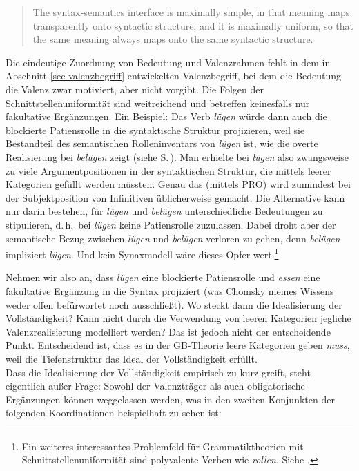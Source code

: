 \begin{quote}
The syntax-semantics interface is maximally simple, in that meaning maps transparently onto syntactic structure; and it is maximally uniform, so that the same meaning always maps onto the same syntactic structure. \citep[47]{Culicover:Jackendoff:05}
\end{quote}
Die eindeutige Zuordnung von Bedeutung und Valenzrahmen fehlt in dem in Abschnitt \ref{sec-valenzbegriff} entwickelten Valenzbegriff, bei dem die Bedeutung die Valenz zwar motiviert, aber nicht vorgibt. Die Folgen der Schnittstellenuniformität sind weitreichend und betreffen keinesfalls nur fakultative Ergänzungen. Ein Beispiel: Das Verb {\it lügen} würde dann auch die blockierte Patiensrolle in die syntaktische Struktur projizieren, weil sie Bestandteil des semantischen Rolleninventars von \textit{lügen} ist, wie die overte Realisierung bei {\it belügen} zeigt (siehe S.\,\pageref{ex-luegen}). Man erhielte bei \textit{lügen} also zwangsweise zu viele Argumentpositionen in der syntaktischen Struktur, die mittels leerer Kategorien gefüllt werden müssten. Genau das (mittels PRO) wird zumindest bei der Subjektposition von Infinitiven üblicherweise gemacht. Die Alternative kann nur darin bestehen, für {\it lügen} und {\it belügen} unterschiedliche Bedeutungen zu stipulieren, d.\,h.\ bei \textit{lügen} keine Patiensrolle zuzulassen. Dabei droht aber der semantische Bezug zwischen \textit{lügen} und \textit{belügen} verloren zu gehen, denn \textit{belügen} impliziert \textit{lügen}. Und kein Synaxmodell wäre dieses Opfer wert.\footnote{Ein weiteres interessantes Problemfeld für Grammatiktheorien mit Schnittstellenuniformität sind polyvalente Verben wie {\it rollen}. Siehe \citet{Vogel:98}.} 

Nehmen wir also an, dass \textit{lügen} eine blockierte Patiensrolle und \textit{essen} eine fakultative Ergänzung in die Syntax projiziert (was Chomsky meines Wissens weder offen befürwortet noch ausschließt). Wo steckt dann die Idealisierung der Vollständigkeit? Kann nicht durch die Verwendung von leeren Kategorien jegliche Valenzrealisierung modelliert werden? Das ist jedoch nicht der entscheidende Punkt. Entscheidend ist, dass es in der GB-Theorie leere Kategorien geben {\it muss}, weil die Tiefenstruktur das Ideal der Vollständigkeit erfüllt.  \\

Dass die Idealisierung der Vollständigkeit empirisch zu kurz greift, steht eigentlich au\ss er Frage: Sowohl der Valenzträger als auch obligatorische Ergänzungen können weggelassen werden, was in den zweiten Konjunkten der folgenden Koordinationen beispielhaft zu sehen ist:

